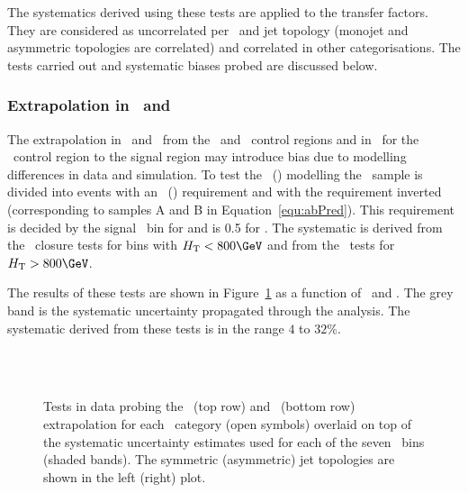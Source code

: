 The systematics derived using these tests are applied to the transfer factors. They are considered
as uncorrelated per \scalht~and jet topology (monojet and asymmetric topologies are correlated) and correlated in other categorisations. The tests carried 
out and systematic biases probed are discussed below.

\subsubsection{Extrapolation in \alphat~and \bdphi}

The extrapolation in \alphat~and \bdphi~from the \mj~and \mmj~control regions 
and in \bdphi~for the \gj~control region to the signal region may introduce bias
 due to modelling differences in data and simulation. To test the \alphat~(\bdphi) modelling the \mj~sample is divided 
into events with an \alphat~(\bdphi) requirement and with the requirement inverted (corresponding
to samples A and B in Equation~\ref{equ:abPred}). This requirement is decided by the signal \scalht~bin for 
\alphat and is 0.5 for \bdphi. The systematic is derived from the \alphat~closure tests for
bins with $\scalht < 800 \GeV$ and from the \bdphi~tests for $\scalht > 800 \GeV$.

The results of these tests are shown in Figure~\ref{fig:closureAlphaT} as a function of \scalht~and \njet. 
The grey band is the systematic uncertainty propagated through the analysis. 
The systematic derived from these tests is
in the range $4$ to $32\%$.

\begin{figure}[h!]
  \begin{center}
    ~~
    \\
    ~~

    \caption{Tests in data probing the \alphat~(top row) and \bdphi~(bottom row) extrapolation for each
      \njet~category (open symbols) overlaid on top of the systematic
      uncertainty estimates used for each of the seven \scalht~bins (shaded bands). 
      The symmetric (asymmetric) jet topologies are shown in the left (right) plot. 
    }
    \label{fig:closureAlphaT}
  \end{center} 
\end{figure}
